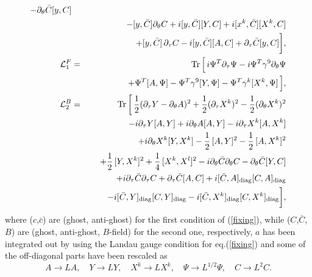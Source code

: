 \documentclass[a4paper,12pt]{article}
\newcommand{\nn}{\nonumber\\}
\newcommand{\calL}{\mathcal{L}}
\newcommand{\diag}{\rm diag}
\newcommand{\ptau}{\partial_\tau}
\newcommand{\pth}{\partial_\theta}
\newcommand{\Tr}{\mathop{\mathrm{Tr}}}
\begin{document}
\begin{eqnarray}
	-\pth\bar{C}[y,C]\nn
  &&\hspace{4ex}-[y,\bar{C}]\pth C +i[y,\bar{C}][Y,C]
	+i[x^k,\bar{C}][X^k,C]\nn
  &&\hspace{4ex}+ [y,\bar{C}]\,\ptau C -i[y,\bar{C}][A,C]
	+\ptau \bar{C}[y,C]\bigg],\label{1b}\\
 \calL^F_{1}&=&\Tr\Big[\,i\Psi^T\ptau \Psi
		-i\Psi^T\gamma^9\pth \Psi\nn
  &&\hspace{4ex}+\Psi^T[A,\Psi]-\Psi^T\gamma^9[Y,\Psi]
		-\Psi^T\gamma^k[X^k,\Psi]\,\Big],\label{2f}\\
  \calL^B_2&=&\Tr\bigg[\,\frac{1}{2}(\ptau  Y - \pth A)^2
	+\frac{1}{2}(\ptau  X^k)^2 -\frac{1}{2}(\pth  X^k)^2\nn
  &&\hspace{3ex}-i\ptau Y[A,Y] +i\pth A[A,Y]
	-i\ptau X^k[A,X^k]\nn
  &&\hspace{3ex} +i\pth X^k[Y,X^k] -\frac{1}{2}\,[A,Y]^2
	 -\frac{1}{2}\,[A,X^k]^2\nn
  &&\hspace{3ex}+ \frac{1}{2}\,[Y,X^k]^2+ \frac{1}{4}\,[X^k,X^l]^2
	-i\pth \bar{C}\pth C -\pth \bar{C}[Y,C]\nn
  &&\hspace{3ex} +i\ptau \bar{C}\ptau C	+\ptau\bar{C}[A,C]
	+i[\bar{C},A]_{\diag}[C,A]_{\diag}\nn
  &&\hspace{3ex} -i[\bar{C},Y]_{\diag}[C,Y]_{\diag}
  -i[\bar{C},X^k]_{\diag}[C,X^k]_{\diag}\bigg],\label{2b}
\end{eqnarray}
where ($c$,$\bar{c}$) are (ghost, anti-ghost) for the first
condition of (\ref{fixing}), while ($C$,$\bar{C}$,$B$) are (ghost,
anti-ghost, $B$-field) for the second one, respectively,
$a$ has been integrated out by using the Landau
gauge condition for eq.(\ref{fixing}) and some of
the off-diagonal parts have been rescaled as \cite{SY}
\begin{equation}
  A\to LA, \quad Y\to LY,\quad X^k\to LX^k,\quad\Psi\to L^{1/2}\Psi,
  \quad C\to L^2C.
\end{equation}
\end{document}
